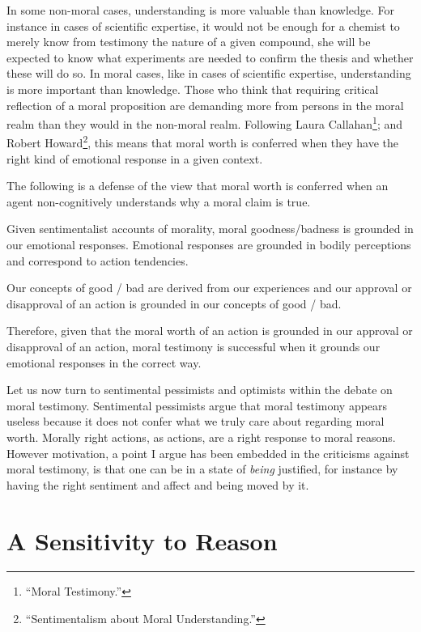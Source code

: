 \documentclass[phdthesis,12pt,final]{wuthesis}
\theoremstyle{definition}
\theoremstyle{definition}
\theoremstyle{definition}
\theoremstyle{definition}
\theoremstyle{remark}
\begin{document}
In some non-moral cases, understanding is more valuable than knowledge. For instance in cases of scientific expertise, it would not be enough for a chemist to merely know from testimony the nature of a given compound, she will be expected to know what experiments are needed to confirm the thesis and whether these will do so. In moral cases, like in cases of scientific expertise, understanding is more important than knowledge. Those who think that requiring critical reflection of a moral proposition are demanding more from persons in the moral realm than they would in the non-moral realm. Following Laura Callahan\footnote{{``Moral {Testimony}.''}}; and Robert Howard\footnote{{``Sentimentalism about {Moral Understanding}.''}}, this means that moral worth is conferred when they have the right kind of emotional response in a given context.

The following is a defense of the view that moral worth is conferred when an agent non-cognitively understands why a moral claim is true.

Given sentimentalist accounts of morality, moral goodness/badness is grounded in our emotional responses. Emotional responses are grounded in bodily perceptions and correspond to action tendencies.

Our concepts of good / bad are derived from our experiences and our approval or disapproval of an action is grounded in our concepts of good / bad.

Therefore, given that the moral worth of an action is grounded in our approval or disapproval of an action, moral testimony is successful when it grounds our emotional responses in the correct way.

Let us now turn to sentimental pessimists and optimists within the debate on moral testimony. Sentimental pessimists argue that moral testimony appears useless because it does not confer what we truly care about regarding moral worth. Morally right actions, as actions, are a right response to moral reasons. However motivation, a point I argue has been embedded in the criticisms against moral testimony, is that one can be in a state of \emph{being} justified, for instance by having the right sentiment and affect and being moved by it.

\section{A Sensitivity to Reason}\label{a-sensitivity-to-reason}
\end{document}
